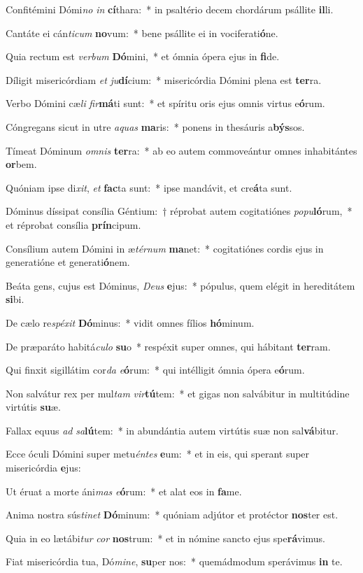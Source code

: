 \item Confitémini Dómi\textit{no} \textit{in} \textbf{cí}thara:~* in psaltério decem chordárum psállite \textbf{il}li.
\item Cantáte ei cán\textit{ti}\textit{cum} \textbf{no}vum:~* bene psállite ei in vociferati\textbf{ó}ne.
\item Quia rectum est \textit{ver}\textit{bum} \textbf{Dó}mini,~* et ómnia ópera ejus in \textbf{fi}de.
\item Díligit misericórdiam \textit{et} \textit{ju}\textbf{dí}cium:~* misericórdia Dómini plena est \textbf{ter}ra.
\item Verbo Dómini cæ\textit{li} \textit{fir}\textbf{má}ti sunt:~* et spíritu oris ejus omnis virtus e\textbf{ó}rum.
\item Cóngregans sicut in utre \textit{a}\textit{quas} \textbf{ma}ris:~* ponens in thesáuris a\textbf{býs}sos.
\item Tímeat Dóminum \textit{om}\textit{nis} \textbf{ter}ra:~* ab eo autem commoveántur omnes inhabitántes \textbf{or}bem.
\item Quóniam ipse di\textit{xit}, \textit{et} \textbf{fac}ta sunt:~* ipse mandávit, et cre\textbf{á}ta sunt.
\item Dóminus díssipat consília Géntium:~† réprobat autem cogitatiónes \textit{po}\textit{pu}\textbf{ló}rum,~* et réprobat consília \textbf{prín}cipum.
\item Consílium autem Dómini in æ\textit{tér}\textit{num} \textbf{ma}net:~* cogitatiónes cordis ejus in generatióne et generati\textbf{ó}nem.
\item Beáta gens, cujus est Dóminus, \textit{De}\textit{us} \textbf{e}jus:~* pópulus, quem elégit in hereditátem \textbf{si}bi.
\item De cælo re\textit{spé}\textit{xit} \textbf{Dó}minus:~* vidit omnes fílios \textbf{hó}minum.
\item De præparáto habitá\textit{cu}\textit{lo} \textbf{su}o~* respéxit super omnes, qui hábitant \textbf{ter}ram.
\item Qui finxit sigillátim cor\textit{da} \textit{e}\textbf{ó}rum:~* qui intélligit ómnia ópera e\textbf{ó}rum.
\item Non salvátur rex per mul\textit{tam} \textit{vir}\textbf{tú}tem:~* et gigas non salvábitur in multitúdine virtútis \textbf{su}æ.
\item Fallax equus \textit{ad} \textit{sa}\textbf{lú}tem:~* in abundántia autem virtútis suæ non sal\textbf{vá}bitur.
\item Ecce óculi Dómini super metu\textit{én}\textit{tes} \textbf{e}um:~* et in eis, qui sperant super misericórdia \textbf{e}jus:
\item Ut éruat a morte áni\textit{mas} \textit{e}\textbf{ó}rum:~* et alat eos in \textbf{fa}me.
\item Anima nostra sús\textit{ti}\textit{net} \textbf{Dó}minum:~* quóniam adjútor et protéctor \textbf{nos}ter est.
\item Quia in eo lætábi\textit{tur} \textit{cor} \textbf{nos}trum:~* et in nómine sancto ejus spe\textbf{rá}vimus.
\item Fiat misericórdia tua, Dó\textit{mi}\textit{ne}, \textbf{su}per nos:~* quemádmodum sperávimus \textbf{in} te.
